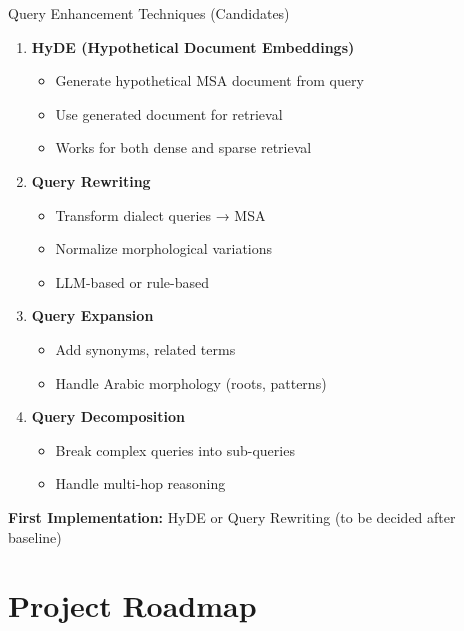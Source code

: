 \documentclass[aspectratio=169]{beamer}
\begin{document}
\begin{frame}{Query Enhancement Techniques (Candidates)}
\begin{enumerate}
    \item \textbf{HyDE (Hypothetical Document Embeddings)}
    \begin{itemize}
        \item Generate hypothetical MSA document from query
        \item Use generated document for retrieval
        \item Works for both dense and sparse retrieval
    \end{itemize}
    
    \item \textbf{Query Rewriting}
    \begin{itemize}
        \item Transform dialect queries → MSA
        \item Normalize morphological variations
        \item LLM-based or rule-based
    \end{itemize}
    
    \item \textbf{Query Expansion}
    \begin{itemize}
        \item Add synonyms, related terms
        \item Handle Arabic morphology (roots, patterns)
    \end{itemize}
    
    \item \textbf{Query Decomposition}
    \begin{itemize}
        \item Break complex queries into sub-queries
        \item Handle multi-hop reasoning
    \end{itemize}
\end{enumerate}

\textbf{First Implementation:} HyDE or Query Rewriting (to be decided after baseline)
\end{frame}

\section{Project Roadmap}
\end{document}

